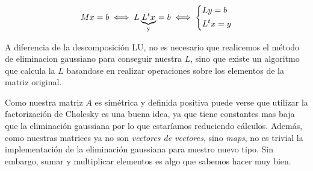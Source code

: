 \begin{center}
\[
M x = b \iff L \underbrace{L^t x}_{\text{y}} = b \iff
\begin{dcases}
    L y = b \\
    L^t x = y
\end{dcases}
\]
\end{center}

A diferencia de la descomposición LU, no es necesario que realicemos el método de eliminacion gaussiano para conseguir nuestra $L$, sino que existe un algoritmo que calcula la $L$ basandose en realizar operaciones sobre los elementos de la matriz original.













Como nuestra matriz $A$ es simétrica y definida positiva  puede verse que utilizar la factorización de Cholesky es una buena idea, ya que tiene constantes mas baja que la eliminación gaussiana por lo que estaríamos reduciendo cálculos. Además, como nuestras matrices ya no son \textit{vectores de vectores}, sino \textit{maps},  no es trivial la implementación de la eliminación gaussiana para nuestro nuevo tipo. Sin embargo, sumar y multiplicar elementos es algo que sabemos hacer muy bien. \\



